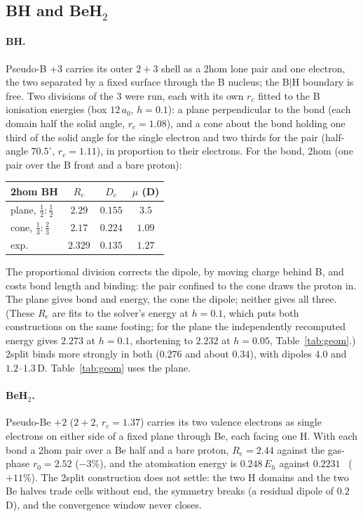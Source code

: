 \documentclass[11pt]{article}
\begin{document}
\subsection{BH and BeH$_2$}
\label{sec:bh}

\paragraph{BH.} Pseudo-B $+3$ carries its outer $2{+}3$ shell as a 2hom lone pair and one electron,
the two separated by a fixed surface through the B nucleus; the B$|$H boundary is free. Two
divisions of the $3$ were run, each with its own $r_c$ fitted to the B ionisation energies (box
$12\,a_0$, $h = 0.1$): a plane perpendicular to the bond (each domain half the solid angle,
$r_c = 1.08$), and a cone about the bond holding one third of the solid angle for the single
electron and two thirds for the pair (half-angle $70.5^\circ$, $r_c = 1.11$), in proportion to their
electrons. For the bond, 2hom (one pair over the B front and a bare proton):
\begin{center}
\small
\begin{tabular}{lccc}
\toprule
2hom BH & $R_e$ & $D_e$ & $\mu$ (D) \\
\midrule
plane, $\tfrac12{:}\tfrac12$ & $2.29$ & $0.155$ & $3.5$ \\
cone, $\tfrac13{:}\tfrac23$  & $2.17$ & $0.224$ & $1.09$ \\
exp.                         & $2.329$ & $0.135$ & $1.27$ \\
\bottomrule
\end{tabular}
\end{center}
The proportional division corrects the dipole, by moving charge behind B, and costs bond length and
binding: the pair confined to the cone draws the proton in. The plane gives bond and energy, the
cone the dipole; neither gives all three. (These $R_e$ are fits to the solver's energy at $h = 0.1$, which
puts both constructions on the same footing; for the plane the independently recomputed energy gives $2.273$ at
$h = 0.1$, shortening to $2.232$ at $h = 0.05$, Table~\ref{tab:geom}.) 2split binds more strongly in both ($0.276$ and about
$0.34$), with dipoles $4.0$ and $1.2$--$1.3$\,D. Table~\ref{tab:geom} uses the plane.

\paragraph{BeH$_2$.} Pseudo-Be $+2$ ($2{+}2$, $r_c = 1.37$) carries its two valence electrons as
single electrons on either side of a fixed plane through Be, each facing one H. With each bond a
2hom pair over a Be half and a bare proton, $R_e = 2.44$ against the gas-phase $r_0 = 2.52$
($-3\%$), and the atomisation energy is $0.248\,E_h$ against $0.2231$~\cite{osti} ($+11\%$). The
2split construction does not settle: the two H domains and the two Be halves trade cells without
end, the symmetry breaks (a residual dipole of $0.2$\,D), and the convergence window never closes.
\end{document}
